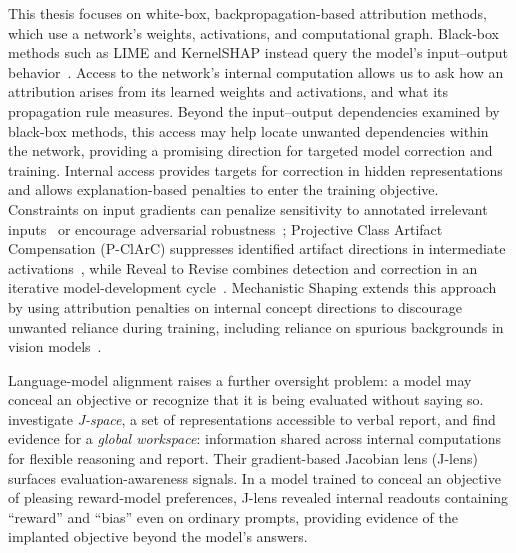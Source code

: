 This thesis focuses on white-box, backpropagation-based attribution methods, which use a network's weights, activations, and computational graph. Black-box methods such as LIME and KernelSHAP instead query the model's input--output behavior~\parencite{Ribeiro2016,LundbergLee2017}. Access to the network's internal computation allows us to ask how an attribution arises from its learned weights and activations, and what its propagation rule measures. Beyond the input--output dependencies examined by black-box methods, this access may help locate unwanted dependencies within the network, providing a promising direction for targeted model correction and training.
Internal access provides targets for correction in hidden representations and allows explanation-based penalties to enter the training objective. Constraints on input gradients can penalize sensitivity to annotated irrelevant inputs~\parencite{Ross2017RightReasons} or encourage adversarial robustness~\parencite{Ross2018InputGradients}; Projective Class Artifact Compensation (P-ClArC) suppresses identified artifact directions in intermediate activations~\parencite{Anders2020ClArC}, while Reveal to Revise combines detection and correction in an iterative model-development cycle~\parencite{Pahde2023R2R}. Mechanistic Shaping extends this approach by using attribution penalties on internal concept directions to discourage unwanted reliance during training, including reliance on spurious backgrounds in vision models~\parencite{Fel2026MechanisticShaping}.

Language-model alignment raises a further oversight problem: a model may conceal an objective or recognize that it is being evaluated without saying so. \textcite{Gurnee2026Workspace} investigate \emph{J-space}, a set of representations accessible to verbal report, and find evidence for a \emph{global workspace}: information shared across internal computations for flexible reasoning and report. Their gradient-based Jacobian lens (J-lens) surfaces evaluation-awareness signals. In a model trained to conceal an objective of pleasing reward-model preferences, J-lens revealed internal readouts containing ``reward'' and ``bias'' even on ordinary prompts, providing evidence of the implanted objective beyond the model's answers.

